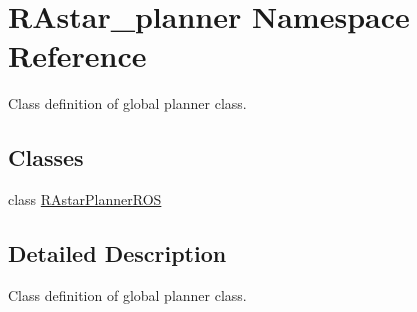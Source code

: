 \hypertarget{namespaceRAstar__planner}{\section{R\-Astar\-\_\-planner Namespace Reference}
\label{namespaceRAstar__planner}
}


Class definition of global planner class.  


\subsection*{Classes}
\begin{DoxyCompactItemize}
\item 
class \hyperlink{classRAstar__planner_1_1RAstarPlannerROS}{R\-Astar\-Planner\-R\-O\-S}
\end{DoxyCompactItemize}


\subsection{Detailed Description}
Class definition of global planner class. 